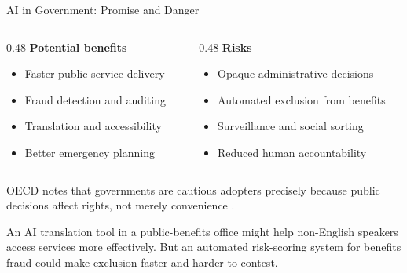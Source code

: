 \documentclass[aspectratio=169,11pt]{beamer}
\begin{document}
\begin{frame}{AI in Government: Promise and Danger}
\begin{columns}[T]
\begin{column}{0.48\textwidth}
\textbf{Potential benefits}
\begin{itemize}
    \item Faster public-service delivery
    \item Fraud detection and auditing
    \item Translation and accessibility
    \item Better emergency planning
\end{itemize}
\end{column}
\begin{column}{0.48\textwidth}
\textbf{Risks}
\begin{itemize}
    \item Opaque administrative decisions
    \item Automated exclusion from benefits
    \item Surveillance and social sorting
    \item Reduced human accountability
\end{itemize}
\end{column}
\end{columns}

\vspace{0.2cm}
OECD notes that governments are cautious adopters precisely because public decisions affect rights, not merely convenience \parencite{oecd_ai_government_2026}.

\vspace{0.2cm}
\begin{casestudybox}[Example]
\scriptsize
An AI translation tool in a public-benefits office might help non-English speakers access services more effectively. But an automated risk-scoring system for benefits fraud could make exclusion faster and harder to contest.
\end{casestudybox}
\end{frame}
\end{document}
